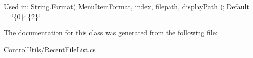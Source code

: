 Used in\+: String.\+Format( Menu\+Item\+Format, index, filepath, display\+Path ); Default = \char`\"{}\{0\}\+:  \{2\}\char`\"{} 



The documentation for this class was generated from the following file\+:\begin{DoxyCompactItemize}
\item 
Control\+Utils/Recent\+File\+List.\+cs\end{DoxyCompactItemize}
